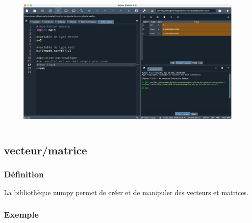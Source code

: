 \documentclass[a4paper,12pt]{article}
\begin{document}
\begin{figure}[h]
\begin{center}
\includegraphics[height=7cm]{./png/entier-reel.png}
\end{center}
\end{figure}

\clearpage
\subsection{vecteur/matrice}
\subsubsection{Définition}
La bibliothèque numpy permet de créer et de manipuler des vecteurs et matrices.
\subsubsection{Exemple}

\end{document}
